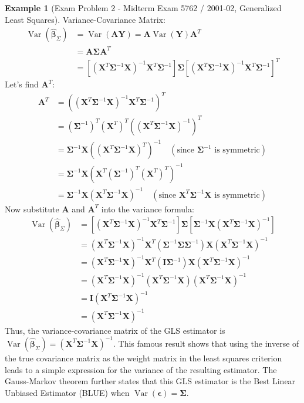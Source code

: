 \documentclass[11pt]{article}
\theoremstyle{definition}
\newtheorem{example}[theorem]{Example}
\theoremstyle{remark}
\DeclareMathOperator{\Var}{\operatorname{Var}}
\begin{document}
\begin{example}[Exam Problem 2 - Midterm Exam 5762 / 2001-02, Generalized Least Squares]
Variance-Covariance Matrix:
\begin{align*} \Var(\hat{\bm{\beta}}_{\Sigma}) &= \Var(\bm{A}\bm{Y}) = \bm{A} \Var(\bm{Y}) \bm{A}^T \\ &= \bm{A} \bm{\Sigma} \bm{A}^T \\ &= [(\bm{X}^T \bm{\Sigma}^{-1} \bm{X})^{-1} \bm{X}^T \bm{\Sigma}^{-1}] \bm{\Sigma} [(\bm{X}^T \bm{\Sigma}^{-1} \bm{X})^{-1} \bm{X}^T \bm{\Sigma}^{-1}]^T \end{align*}
Let's find $\bm{A}^T$:
\begin{align*} \bm{A}^T &= ((\bm{X}^T \bm{\Sigma}^{-1} \bm{X})^{-1} \bm{X}^T \bm{\Sigma}^{-1})^T \\ &= (\bm{\Sigma}^{-1})^T (\bm{X}^T)^T ((\bm{X}^T \bm{\Sigma}^{-1} \bm{X})^{-1})^T \\ &= \bm{\Sigma}^{-1} \bm{X} ((\bm{X}^T \bm{\Sigma}^{-1} \bm{X})^{T})^{-1} \quad (\text{since } \bm{\Sigma}^{-1} \text{ is symmetric}) \\ &= \bm{\Sigma}^{-1} \bm{X} (\bm{X}^T (\bm{\Sigma}^{-1})^T (\bm{X}^T)^T)^{-1} \\ &= \bm{\Sigma}^{-1} \bm{X} (\bm{X}^T \bm{\Sigma}^{-1} \bm{X})^{-1} \quad (\text{since } \bm{X}^T \bm{\Sigma}^{-1} \bm{X} \text{ is symmetric}) \end{align*}
Now substitute $\bm{A}$ and $\bm{A}^T$ into the variance formula:
\begin{align*} \Var(\hat{\bm{\beta}}_{\Sigma}) &= [(\bm{X}^T \bm{\Sigma}^{-1} \bm{X})^{-1} \bm{X}^T \bm{\Sigma}^{-1}] \bm{\Sigma} [\bm{\Sigma}^{-1} \bm{X} (\bm{X}^T \bm{\Sigma}^{-1} \bm{X})^{-1}] \\ &= (\bm{X}^T \bm{\Sigma}^{-1} \bm{X})^{-1} \bm{X}^T (\bm{\Sigma}^{-1} \bm{\Sigma} \bm{\Sigma}^{-1}) \bm{X} (\bm{X}^T \bm{\Sigma}^{-1} \bm{X})^{-1} \\ &= (\bm{X}^T \bm{\Sigma}^{-1} \bm{X})^{-1} \bm{X}^T (\bm{I} \bm{\Sigma}^{-1}) \bm{X} (\bm{X}^T \bm{\Sigma}^{-1} \bm{X})^{-1} \\ &= (\bm{X}^T \bm{\Sigma}^{-1} \bm{X})^{-1} (\bm{X}^T \bm{\Sigma}^{-1} \bm{X}) (\bm{X}^T \bm{\Sigma}^{-1} \bm{X})^{-1} \\ &= \bm{I} (\bm{X}^T \bm{\Sigma}^{-1} \bm{X})^{-1} \\ &= (\bm{X}^T \bm{\Sigma}^{-1} \bm{X})^{-1} \end{align*}
Thus, the variance-covariance matrix of the GLS estimator is $\Var(\hat{\bm{\beta}}_{\Sigma}) = (\bm{X}^T \bm{\Sigma}^{-1} \bm{X})^{-1}$. This famous result shows that using the inverse of the true covariance matrix as the weight matrix in the least squares criterion leads to a simple expression for the variance of the resulting estimator. The Gauss-Markov theorem further states that this GLS estimator is the Best Linear Unbiased Estimator (BLUE) when $\Var(\bm{\epsilon})=\bm{\Sigma}$.
\end{example}
\end{document}
